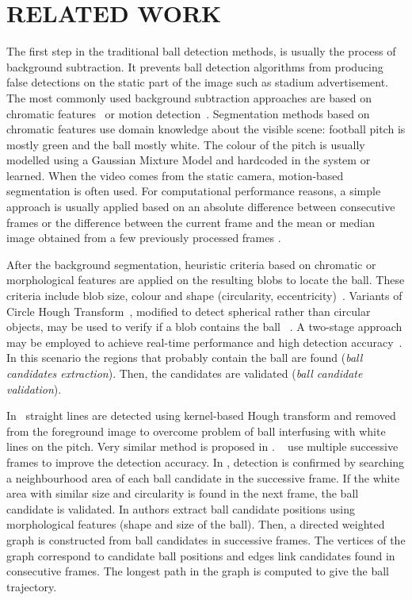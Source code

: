 \documentclass[a4paper,twoside]{article}
\begin{document}
\section{\uppercase{Related Work}}
\noindent
The first step in the traditional ball detection methods, is usually the process of background subtraction. It prevents ball detection algorithms from producing false detections on the static part of the image such as stadium advertisement. 
The most commonly used background subtraction approaches are based on chromatic features~\cite{Gong95,Ali12,Kia16} or motion detection~\cite{DOr02,DOr04,Leo08,Mazz12}.
Segmentation methods based on chromatic features use domain knowledge about the visible scene: football pitch is mostly green and the ball mostly white.  The colour of the pitch is usually modelled using a Gaussian Mixture Model and hardcoded in the system or learned. When the video comes from the static camera, motion-based segmentation is often used. 
For computational performance reasons, a simple approach is usually applied based on an absolute difference between consecutive frames or the difference between the current frame and the mean or median image obtained from a few previously processed frames \cite{High16}.

After the background segmentation, heuristic criteria based on chromatic or morphological features are applied on the resulting blobs to locate the ball. These criteria include blob size, colour and shape (circularity, eccentricity)~\cite{Gong95}. Variants of Circle Hough Transform~\cite{Yuen90}, modified to detect spherical rather than circular objects, may be used to verify if a blob contains the ball ~\cite{DOr02,DOr04,Leo08,Popp10,Halb15}.
A two-stage approach may be employed to achieve real-time performance and high detection accuracy~\cite{DOr02,Leo08,Mazz12}. In this scenario the regions that probably contain the ball are found (\emph{ball candidates extraction}). Then, the candidates are validated (\emph{ball candidate validation}). 


In~\cite{Ali12} straight lines are detected using kernel-based Hough transform and removed from the foreground image to overcome problem of ball interfusing with white lines on the pitch. Very similar method is proposed in \cite{Rao15}. 
~\cite{Gong95,Pall08,Halb15} use multiple successive frames to improve the detection accuracy.
In \cite{Gong95}, detection is confirmed by searching a neighbourhood area of each ball candidate in the successive frame. If the white area with similar size and circularity is found in the next frame, the ball candidate is validated. 
In \cite{Pall08} authors extract ball candidate positions using morphological features (shape and size of the ball). Then, a directed weighted graph is constructed from ball candidates in successive frames. The vertices of the graph correspond to candidate ball positions and edges link candidates found in consecutive frames. The longest path in the graph is computed to give the ball trajectory.
\end{document}

